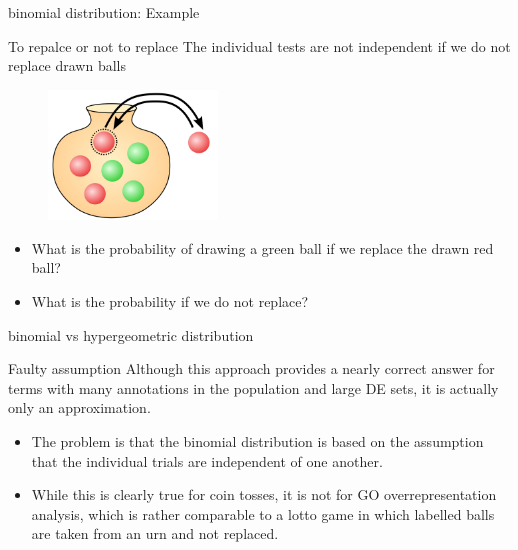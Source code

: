 \documentclass{beamer}
\begin{document}
\begin{frame}{binomial distribution: Example}
\begin{mybluebox}{To repalce or not to replace}
The individual tests are not independent if we do not replace drawn balls
\end{mybluebox}
\begin{figure}
\centering
\includegraphics[width=0.4\textwidth]{img/urn.png} 

\end{figure}
\begin{itemize}
\item What is the probability of drawing a green ball if we replace the drawn red ball?
\item What is the probability  if we do not replace?

\end{itemize}

\end{frame}




\begin{frame}{binomial vs hypergeometric distribution}
\begin{mybluebox}{Faulty assumption}
 Although this approach provides a nearly correct answer for terms with
many annotations in the population and large DE sets, it is actually
only an approximation. 
\end{mybluebox}
\begin{itemize}
\item The problem is that the binomial distribution
is based on the assumption that the individual trials are independent
of one another. 
\item While this is clearly true for coin tosses, it is not
for GO overrepresentation analysis, which is rather comparable to a
lotto game in which labelled balls are taken from an urn and not
replaced.
\end{itemize}


\end{frame}
\end{document}
